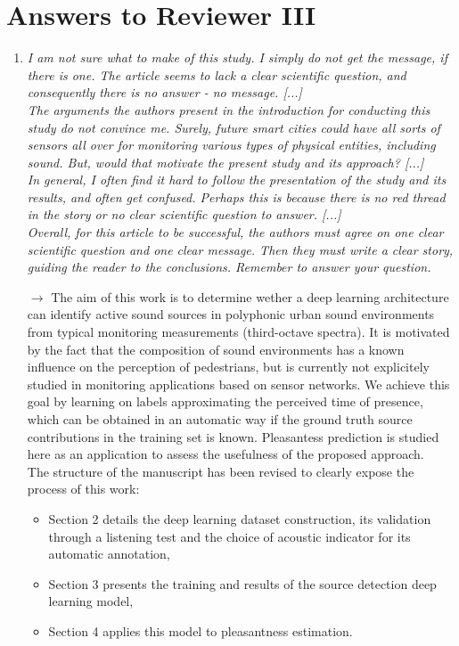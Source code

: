 \documentclass[10pt]{article}
\begin{document}
\section{Answers to Reviewer III}

\begin{enumerate}

\item \emph{I am not sure what to make of this study. I simply do not get the message, if there is one. The article seems to lack a clear scientific question, and consequently there is no answer - no message. [...]\\
The arguments the authors present in the introduction for conducting this study do not convince me. Surely, future smart cities could have all sorts of sensors all over for monitoring various types of physical entities, including sound. But, would that motivate the present study and its approach? [...]\\
In general, I often find it hard to follow the presentation of the study and its results, and often get confused. Perhaps this is because there is no red thread in the story or no clear scientific question to answer. [...]\\
Overall, for this article to be successful, the authors must agree on one clear scientific question and one clear message. Then they must write a clear story, guiding the reader to the conclusions. Remember to answer your question.}

$\rightarrow$ The aim of this work is to determine wether a deep learning architecture can identify active sound sources in polyphonic urban sound environments from typical monitoring measurements (third-octave spectra). It is motivated by the fact that the composition of sound environments has a known influence on the perception of pedestrians, but is currently not explicitely studied in monitoring applications based on sensor networks. We achieve this goal by learning on labels approximating the perceived time of presence, which can be obtained in an automatic way if the ground truth source contributions in the training set is known. Pleasantess prediction is studied here as an application to assess the usefulness of the proposed approach.\\
The structure of the manuscript has been revised to clearly expose the process of this work:
\begin{itemize}
\item Section 2 details the deep learning dataset construction, its validation through a listening test and the choice of acoustic indicator for its automatic annotation,
\item Section 3 presents the training and results of the source detection deep learning model,
\item Section 4 applies this model to pleasantness estimation.
\end{itemize}



\end{enumerate}
\end{document}
